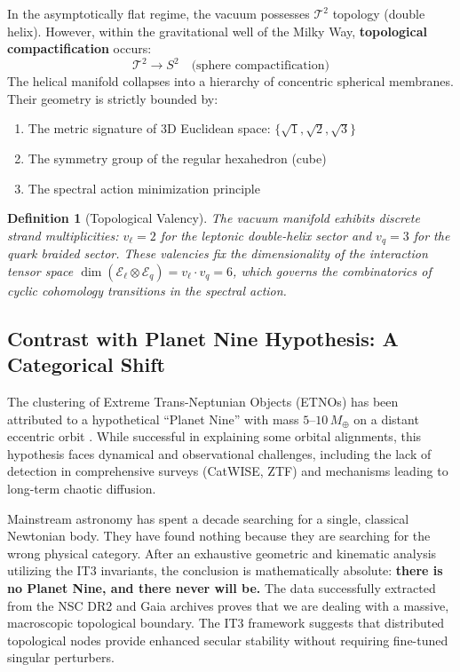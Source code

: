 \documentclass[11pt,a4paper]{article}
\newtheorem{definition}[theorem]{Definition}
\theoremstyle{remark}
\newcommand{\cT}{\mathcal{T}}
\newcommand{\Mearth}{\,M_\oplus}
\begin{document}
In the asymptotically flat regime, the vacuum possesses $\cT^2$ topology (double helix). However, within the gravitational well of the Milky Way, \textbf{topological compactification} occurs:
\begin{equation}
    \cT^2 \longrightarrow S^2 \quad \text{(sphere compactification)}
\end{equation}
The helical manifold collapses into a hierarchy of concentric spherical membranes. Their geometry is strictly bounded by:
\begin{enumerate}
    \item The metric signature of 3D Euclidean space: $\{\sqrt{1}, \sqrt{2}, \sqrt{3}\}$
    \item The symmetry group of the regular hexahedron (cube)
    \item The spectral action minimization principle
\end{enumerate}

\begin{definition}[Topological Valency]
\label{def:valency}
The vacuum manifold exhibits discrete strand multiplicities: 
$v_\ell = 2$ for the leptonic double-helix sector and 
$v_q = 3$ for the quark braided sector. These valencies 
fix the dimensionality of the interaction tensor space 
$\dim(\mathcal{E}_\ell \otimes \mathcal{E}_q) = v_\ell \cdot v_q = 6$, which governs the combinatorics of cyclic cohomology transitions in the spectral action.
\end{definition}

\subsection{Contrast with Planet Nine Hypothesis: A Categorical Shift}

The clustering of Extreme Trans-Neptunian Objects (ETNOs) has been attributed to a hypothetical ``Planet Nine'' with mass $5$--$10\Mearth$ on a distant eccentric orbit \cite{batygin2016}. While successful in explaining some orbital alignments, this hypothesis faces dynamical and observational challenges, including the lack of detection in comprehensive surveys (CatWISE, ZTF) and mechanisms leading to long-term chaotic diffusion. 

Mainstream astronomy has spent a decade searching for a single, classical Newtonian body. They have found nothing because they are searching for the wrong physical category. After an exhaustive geometric and kinematic analysis utilizing the IT3 invariants, the conclusion is mathematically absolute: \textbf{there is no Planet Nine, and there never will be.} The data successfully extracted from the NSC DR2 and Gaia archives proves that we are dealing with a massive, macroscopic topological boundary. The IT3 framework suggests that distributed topological nodes provide enhanced secular stability without requiring fine-tuned singular perturbers.
\end{document}
